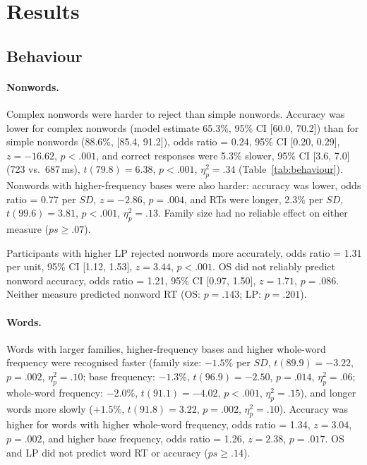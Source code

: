 \section{Results}

\subsection{Behaviour}

\paragraph{Nonwords.}
Complex nonwords were harder to reject than simple nonwords. Accuracy was lower
for complex nonwords (model estimate 65.3\%, 95\% CI [60.0, 70.2]) than for
simple nonwords (88.6\%, [85.4, 91.2]), odds ratio = 0.24, 95\% CI [0.20, 0.29],
$z = -16.62$, $p < .001$, and correct responses were 5.3\% slower, 95\% CI
[3.6, 7.0] (723 vs.\ 687\,ms), $t(79.8) = 6.38$, $p < .001$, $\eta^2_p = .34$
(Table~\ref{tab:behaviour}). Nonwords with higher-frequency bases were also
harder: accuracy was lower, odds ratio = 0.77 per $SD$, $z = -2.86$, $p = .004$,
and RTs were longer, 2.3\% per $SD$, $t(99.6) = 3.81$, $p < .001$,
$\eta^2_p = .13$. Family size had no reliable effect on either measure
($ps \geq .07$).

Participants with higher LP rejected nonwords more accurately, odds ratio = 1.31
per unit, 95\% CI [1.12, 1.53], $z = 3.44$, $p < .001$. OS did not reliably
predict nonword accuracy, odds ratio = 1.21, 95\% CI [0.97, 1.50], $z = 1.71$,
$p = .086$. Neither measure predicted nonword RT (OS: $p = .143$; LP:
$p = .201$).

\paragraph{Words.}
Words with larger families, higher-frequency bases and higher whole-word
frequency were recognised faster (family size: $-1.5\%$ per $SD$, $t(89.9) =
-3.22$, $p = .002$, $\eta^2_p = .10$; base frequency: $-1.3\%$, $t(96.9) = -2.50$,
$p = .014$, $\eta^2_p = .06$; whole-word frequency: $-2.0\%$, $t(91.1) = -4.02$,
$p < .001$, $\eta^2_p = .15$), and longer words more slowly ($+1.5\%$,
$t(91.8) = 3.22$, $p = .002$, $\eta^2_p = .10$). Accuracy was higher for words
with higher whole-word frequency, odds ratio = 1.34, $z = 3.04$, $p = .002$, and
higher base frequency, odds ratio = 1.26, $z = 2.38$, $p = .017$. OS and LP did
not predict word RT or accuracy ($ps \geq .14$).

